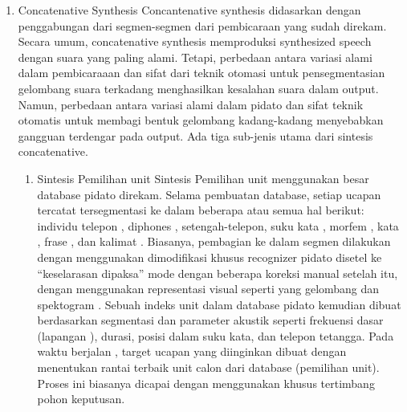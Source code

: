 \begin{enumerate}
\item Concatenative Synthesis
Concantenative synthesis didasarkan dengan penggabungan dari segmen-segmen dari pembicaraan yang sudah direkam. Secara umum, concatenative synthesis memproduksi synthesized speech dengan suara yang paling alami. Tetapi, perbedaan antara variasi alami dalam pembicaraaan dan sifat dari teknik otomasi untuk pensegmentasian gelombang suara terkadang menghasilkan kesalahan suara dalam output. Namun, perbedaan antara variasi alami dalam pidato dan sifat teknik otomatis untuk membagi bentuk gelombang kadang-kadang menyebabkan gangguan terdengar pada output. Ada tiga sub-jenis utama dari sintesis concatenative\cite{Hunt1996UnitSI}.
\begin{enumerate}
\item Sintesis Pemilihan unit
Sintesis Pemilihan unit menggunakan besar database pidato direkam. Selama pembuatan database, setiap ucapan tercatat tersegmentasi ke dalam beberapa atau semua hal berikut: individu telepon , diphones , setengah-telepon, suku kata , morfem , kata , frase , dan kalimat . Biasanya, pembagian ke dalam segmen dilakukan dengan menggunakan dimodifikasi khusus recognizer pidato disetel ke “keselarasan dipaksa” mode dengan beberapa koreksi manual setelah itu, dengan menggunakan representasi visual seperti yang gelombang dan spektogram .  Sebuah indeks unit dalam database pidato kemudian dibuat berdasarkan segmentasi dan parameter akustik seperti frekuensi dasar (lapangan ), durasi, posisi dalam suku kata, dan telepon tetangga. Pada waktu berjalan , target ucapan yang diinginkan dibuat dengan menentukan rantai terbaik unit calon dari database (pemilihan unit). Proses ini biasanya dicapai dengan menggunakan khusus tertimbang pohon keputusan.


\end{enumerate}
\end{enumerate}
